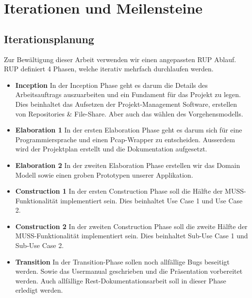 \section{Iterationen und Meilensteine}
\label{sec:Iterationen und Meilensteine}

\subsection{Iterationsplanung}
Zur Bewältigung dieser Arbeit verwenden wir einen angepassten \acl{RUP} Ablauf. \acs{RUP} definiert 4 Phasen, welche iterativ mehrfach durchlaufen werden.

\begin{itemize}
  \item \textbf{Inception} \newline In der Inception Phase geht es darum die Details des Arbeitsauftrags auszuarbeiten und ein Fundament für das Projekt zu legen. Dies beinhaltet das Aufsetzen der Projekt-Management Software, erstellen von Repositories \& File-Share. Aber auch das wählen des Vorgehensmodells.
  \item \textbf{Elaboration 1} \newline In der ersten Elaboration Phase geht es darum sich für eine Programmiersprache und einen Pcap-Wrapper zu entscheiden. Ausserdem wird der Projektplan erstellt und die Dokumentation aufgesetzt.
  \item \textbf{Elaboration 2} \newline In der zweiten Elaboration Phase erstellen wir das Domain Modell sowie einen groben Prototypen unserer Applikation.
  \item \textbf{Construction 1} \newline In der ersten Construction Phase soll die Hälfte der MUSS-Funktionalität implementiert sein. Dies beinhaltet Use Case 1 und Use Case 2.
  \item \textbf{Construction 2} \newline In der zweiten Construction Phase soll die zweite Hälfte der MUSS-Funktionalität implementiert sein. Dies beinhaltet Sub-Use Case 1 und Sub-Use Case 2.
  \item \textbf{Transition} \newline In der Transition-Phase sollen noch allfällige Bugs beseitigt werden. Sowie das Usermanual geschrieben und die Präsentation vorbereitet werden. Auch allfällige Rest-Dokumentationsarbeit soll in dieser Phase erledigt werden.
\end{itemize}

